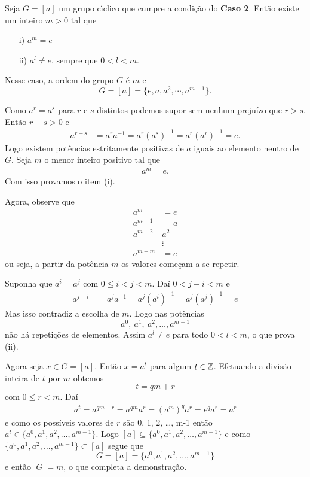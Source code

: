 \begin{proposicao}
    Seja $G = [a]$ um grupo c{\'\i}clico que cumpre a condi\c{c}\~ao do \textbf{Caso 2}. Ent\~ao existe um inteiro $m > 0$ tal que
    \begin{enumerate}
        \item[i)] $a^m = e$

        \item[ii)] $a^l \ne e$, sempre que $0 < l < m$.
    \end{enumerate}
    Nesse caso, a ordem do grupo $G$ \'e $m$ e
    \[
        G = [a] = \{e, a, a^2, \cdots, a^{m - 1}\}.
    \]
\end{proposicao}
\begin{prova}
	Como $a^r = a^s$ para $r$ e $s$ distintos podemos supor sem nenhum prejuízo que $r > s$. Então $r - s > 0$ e
	\begin{align*}
		a^{r - s} &= a^ra^{-1} = a^r(a^s)^{-1} = a^r(a^r)^{-1} = e.
	\end{align*}
	Logo existem potências estritamente positivas de $a$ iguais ao elemento neutro de $G$. Seja $m$ o menor inteiro positivo tal que
	\begin{align}\label{ordem_elemento_ciclico}
		a^m = e.
	\end{align}
	Com isso provamos o item (i).

	Agora, observe que
	\begin{align*}
		a^m &= e\\
		a^{m + 1} &= a\\
		a^{m + 2} & a^2\\
		&\vdots\\
		a^{m + m} &= e
	\end{align*}
	ou seja, a partir da potência $m$ os valores começam a se repetir.

	Suponha que $a^i = a^j$ com $0 \le i < j < m$. Daí $0 < j - i < m$ e
	\begin{align*}
		a^{j -  i} &= a^ja^{-1} = a^j(a^i)^{-1} = a^j(a^j)^{-1} = e
	\end{align*}
	Mas isso contradiz a escolha de $m$. Logo nas potências
	\[
		a^0,\ a^1,\ a^2, \dots, a^{m - 1}
	\]
	não há repetições de elementos. Assim $a^l \ne e$ para todo $0 < l < m$, o que prova (ii).

	Agora seja $x \in G = [a]$. Então $x = a^t$ para algum $t \in \mathbb{Z}$. Efetuando a divisão inteira de $t$ por $m$ obtemos
	\[
		t = qm + r
	\]
	com $0 \le r < m$. Daí
	\begin{align*}
		a^t = a^{qm + r} = a^{qm}a^r = (a^m)^qa^r = e^qa^r = a^r
	\end{align*}
	e como os possíveis valores de $r$ são 0, 1, 2, \dots, m-1 então $a^t \in \{a^0, a^1, a^2, \dots, a^{m - 1}\}$. Logo $[a] \subseteq \{a^0, a^1, a^2, \dots, a^{m - 1}\}$ e como $\{a^0, a^1, a^2, \dots, a^{m - 1}\} \subset [a]$ segue que
	\[
		G = [a] = \{a^0, a^1, a^2, \dots, a^{m - 1}\}
	\]
	e então $|G| = m$, o que completa a demonstração.
\end{prova}


